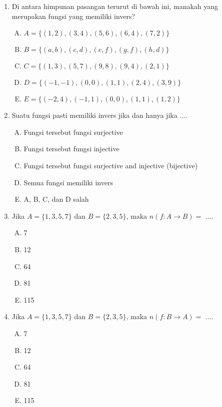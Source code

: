 \documentclass[fleqn, a4paper, 12pt]{article} %
\begin{document}
\begin{enumerate}
		\item Di antara himpunan pasangan terurut di bawah ini, manakah yang merupakan fungsi yang memiliki invers?
			\begin{enumerate}[(A)]
				\item $A = \{(1, 2), (3, 4), (5, 6), (6, 4), (7, 2)\}$
				\item $B = \{(a, b), (c, d), (e, f), (g, f), (h, d)\}$
				\item $C = \{(1, 3), (5, 7), (9, 8), (9, 4), (2, 1)\}$
				\item $D = \{(-1, -1), (0, 0), (1, 1), (2, 4), (3, 9)\}$
				\item $E = \{(-2, 4), (-1, 1), (0, 0), (1, 1), (1, 2)\}$
			\end{enumerate}
		
		\newpage
		
		\item Suatu fungsi pasti memiliki invers jika dan hanya jika ....
		\begin{enumerate}[(A)]
			\item Fungsi tersebut fungsi surjective 
			\item Fungsi tersebut fungsi injective 
			\item Fungsi tersebut fungsi surjective and injective (bijective)
			\item Semua fungsi memiliki invers
			\item A, B, C, dan D salah
		\end{enumerate}
		
		\item Jika $A = \{1, 3, 5, 7\}$ dan $B = \{2, 3, 5\}$, maka $n(f: A \rightarrow B) = $ ....
		\begin{enumerate}[(A)]
			\item 7
			\item 12
			\item 64
			\item 81
			\item 115
		\end{enumerate}
		\item Jika $A = \{1, 3, 5, 7\}$ dan $B = \{2, 3, 5\}$, maka $n(f: B \rightarrow A) = $ ....
		\begin{enumerate}[(A)]
			\item 7
			\item 12
			\item 64
			\item 81
			\item 115
		\end{enumerate}		
		

\end{enumerate}
\end{document}
